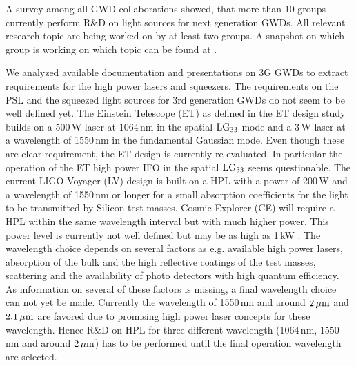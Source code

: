 

A survey among all GWD collaborations showed, that more than 10 groups currently perform R\&D on light sources for next generation GWDs. All relevant research topic are being worked on by at least two groups. A snapshot on which group is working on which topic can be found at \cite{LightSource_RD_table}. 


We analyzed available documentation and presentations on 3G GWDs to extract requirements for the high power lasers and squeezers. 
The requirements on the PSL and the squeezed light sources for 3rd generation GWDs do not seem to be well defined yet. The Einstein Telescope (ET) as defined in the ET design study builds on a 500\,W laser at 1064\,nm in the spatial $\rm LG_{33}$ mode and a 3\,W laser at a wavelength of 1550\,nm in the fundamental Gaussian mode. Even though these are clear requirement, the ET design is currently re-evaluated. In particular the operation of the ET high power IFO in the spatial $\rm LG_{33}$ seems questionable. The current  LIGO Voyager (LV) design is built on a HPL with a power of 200\,W and a wavelength of 1550\,nm or longer for a small absorption coefficients for the light to be transmitted by Silicon test masses. Cosmic Explorer (CE) will require a HPL within the same wavelength interval but with much higher power. This power level is currently not well defined but may be as high as 1\,kW \cite{GWADW2018,ISWP:2018}. The wavelength choice depends on several factors as e.g. available high power lasers, absorption of the bulk and the high reflective coatings of the test masses, scattering and the availability of photo detectors with high quantum efficiency. As information on several of these factors is missing, a final wavelength choice can not yet be made. Currently the wavelength of 1550\,nm and around $\rm 2\, \mu m $ and $\rm 2.1\, \mu m $ are favored due to promising high power laser concepts for these wavelength. Hence R\&D on HPL for three different wavelength (1064\,nm, 1550\,nm and around $\rm 2\, \mu m $) has to be performed until the final operation wavelength are selected. 

